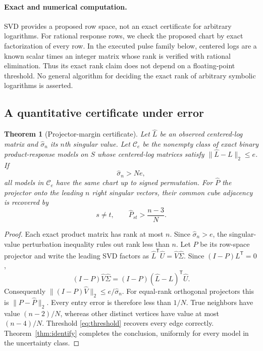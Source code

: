 \documentclass[11pt]{article}
\newtheorem{theorem}{Theorem}
\theoremstyle{definition}\newtheorem{definition}[theorem]{Definition}
\theoremstyle{remark}\newtheorem{remark}[theorem]{Remark}
\begin{document}
\paragraph{Exact and numerical computation.}
SVD provides a proposed row space, not an exact certificate for arbitrary logarithms. For rational response rows, we check the proposed chart by exact factorization of every row. In the executed pulse family below, centered logs are a known scalar times an integer matrix whose rank is verified with rational elimination. Thus its exact rank claim does not depend on a floating-point threshold. No general algorithm for deciding the exact rank of arbitrary symbolic logarithms is asserted.

\subsection{A quantitative certificate under error}
\begin{theorem}[Projector-margin certificate]\label{thm:robust}
Let $\widehat L$ be an observed centered-log matrix and $\widehat\sigma_n$ its $n$th singular value. Let $\mathcal C_e$ be the nonempty class of exact binary product-response models on $S$ whose centered-log matrices satisfy $\|\widehat L-L\|_2\le e$. If
\begin{equation}
\widehat\sigma_n>Ne,\label{eq:margin}
\end{equation}
all models in $\mathcal C_e$ have the same chart up to signed permutation. For $\widehat P$ the projector onto the leading $n$ right singular vectors, their common cube adjacency is recovered by
\begin{equation}
s\ne t,\qquad \widehat P_{st}>\frac{n-3}{N}.\label{eq:threshold}
\end{equation}
\end{theorem}
\begin{proof}
Each exact product matrix has rank at most $n$. Since $\widehat\sigma_n>e$, the singular-value perturbation inequality rules out rank less than $n$. Let $P$ be its row-space projector and write the leading SVD factors as $\widehat L^{\mathsf T}\widehat U=\widehat V\widehat\Sigma$. Since $(I-P)L^{\mathsf T}=0$,
\begin{equation}
(I-P)\widehat V\widehat\Sigma=(I-P)(\widehat L-L)^{\mathsf T}\widehat U.
\end{equation}
Consequently $\|(I-P)\widehat V\|_2\le e/\widehat\sigma_n$. For equal-rank orthogonal projectors this is $\|P-\widehat P\|_2$. Every entry error is therefore less than $1/N$. True neighbors have value $(n-2)/N$, whereas other distinct vertices have value at most $(n-4)/N$. Threshold \eqref{eq:threshold} recovers every edge correctly. Theorem~\ref{thm:identify} completes the conclusion, uniformly for every model in the uncertainty class.
\end{proof}
\end{document}
